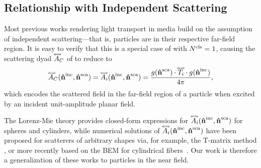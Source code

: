 \subsection{Relationship with Independent Scattering}
\label{ssec:ours_indep_scat}

Most previous works rendering light transport in media \cite{novak2018monte} build on the assumption of independent scattering---that is, particles are in their respective far-field region.
It is easy to verify that this is a special case of  with ${N^\text{cls}}=1$, causing 
the scattering dyad $\accentset{\Longleftrightarrow}{A}_C$ of  to reduce to
\begin{equation}
    \label{eq:farscatmie}
    \accentset{\Longleftrightarrow}{A}_C(\mathbf{\hat{n}}^{\text{inc}},\mathbf{\hat{n}}^{\text{sca}}) = \accentset{\Longleftrightarrow}{A}_i(\mathbf{\hat{n}}^{\text{inc}},\mathbf{\hat{n}}^{\text{sca}}) = \frac{g(\mathbf{\hat{n}}^{\text{sca}})\cdot \accentset{\Longleftrightarrow}{T}_i  \cdot g(\mathbf{\hat{n}}^{\text{inc}})}{4\pi},
\end{equation}
which encodes the scattered field in the far-field region of a particle when excited by an incident unit-amplitude planar field. 

The Lorenz-Mie theory \cite{hulst1981light} provides closed-form expressions for $\accentset{\Longleftrightarrow}{A}_i(\mathbf{\hat{n}}^{\text{inc}},\mathbf{\hat{n}}^{\text{sca}})$ for spheres and cylinders, while numerical solutions of $\accentset{\Longleftrightarrow}{A}_i(\mathbf{\hat{n}}^{\text{inc}},\mathbf{\hat{n}}^{\text{sca}})$ have been proposed for scatterers of arbitrary shapes via, for example, the T-matrix method \cite{waterman1965matrix}, or more recently based on the BEM for cylindrical fibers~\cite{xia2020wave}. Our work is therefore a generalization of these works to particles in the near field. 
